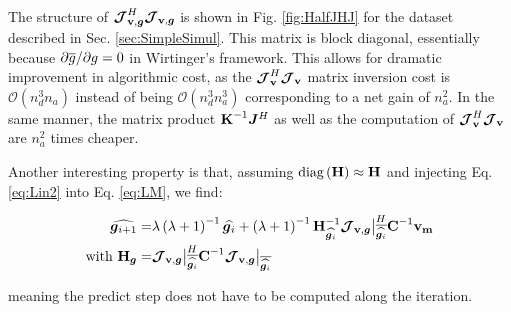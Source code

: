 The structure of $\bm{\mathcal{J}}_{\textbf{v},\bm{g}}^H\bm{\mathcal{J}}_{\textbf{v},\bm{g}}$ is shown in Fig. \ref{fig:HalfJHJ} for
the dataset described in Sec. \ref{sec:SimpleSimul}. This
matrix is block diagonal, essentially because 
$\partial \overline{g}/\partial g=0$ in Wirtinger's framework. This allows
for dramatic improvement in algorithmic cost, as the $\bm{\mathcal{J}}_{\textbf{v}}^H\bm{\mathcal{J}}_{\textbf{v}}$ matrix
inversion cost is $\mathcal{O}\left(n_d^3n_a\right)$ instead of being
$\mathcal{O}\left(n_d^3n_a^3\right)$ corresponding to a net gain of $n^2_a$. In the same manner, the
matrix product $\textbf{K}^{-1}\bm{J}^H$ as well as the
computation of $\bm{\mathcal{J}}_{\textbf{v}}^H\bm{\mathcal{J}}_{\textbf{v}}$ are $n^2_a$ times cheaper.

Another interesting property is that, assuming
$\text{diag}\left(\textbf{H}\right)\approx\textbf{H}$ and injecting Eq. \ref{eq:Lin2}
into Eq. \ref{eq:LM}, we find:

\def\Fact{\left(\lambda+1\right)^{-1}}
\def\ThisJ{\JVg\big|_{\conj{\widehat{\g_{i}}}}}
\begin{alignat}{2}
\label{eq:HalfLM}
\widehat{\vec{g}_{i+1}}=&\lambda\Fact\widehat{\vec{g}_{i}}+\Fact\H_{\widehat{\vec{g}_{i}}}^{-1}\ThisJ^H\textbf{C}^{-1}\mathbf{v_m}\\
\text{with }\H_{\vec{g}}=&\ThisJ^H\textbf{C}^{-1}\ThisJ
\end{alignat}

\noindent meaning the predict step does not have to be computed along
the iteration.





